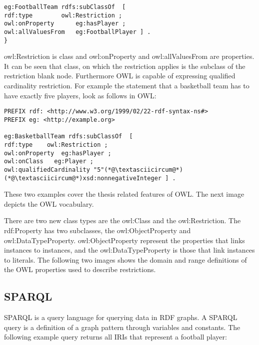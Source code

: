 \begin{lstlisting}[basicstyle=\footnotesize, captionpos=b, caption=OWL restriction in N3 format, label=lst:sparql,
frame=single]
eg:FootballTeam rdfs:subClassOf  [ 
rdf:type		owl:Restriction ; 
owl:onProperty		eg:hasPlayer ; 
owl:allValuesFrom	eg:FootballPlayer ] . 
}
\end{lstlisting}

owl:Restriction is class and owl:onProperty and owl:allValuesFrom are properties. It can be seen that class, on which the restriction applies is the subclass of the restriction blank node.
Furthermore OWL is capable of expressing qualified cardinality restriction. For example the statement that a basketball team has to have exactly five players, look as follows in OWL:


\begin{lstlisting}[captionpos=b, caption=OWL restriction in N3 format, label=lst:sparql,
basicstyle=\footnotesize,frame=single]
PREFIX rdf: <http://www.w3.org/1999/02/22-rdf-syntax-ns#>
PREFIX eg: <http://example.org> 

eg:BasketballTeam rdfs:subClassOf  [
rdf:type	owl:Restriction ; 
owl:onProperty	eg:hasPlayer ; 
owl:onClass	  eg:Player ; 
owl:qualifiedCardinality "5"(*@\textasciicircum@*)(*@\textasciicircum@*)xsd:nonnegativeInteger ] . 

\end{lstlisting}


These two examples cover the thesis related features of OWL. The next image depicts the OWL vocabulary. 



There are two new class types are the owl:Class and the owl:Restriction. The rdf:Property has two subclasses, the owl:ObjectProperty and owl:DataTypeProperty. owl:ObjectProperty represent the properties that links instances to instances, and the owl:DataTypeProperty is those that link instances to literals. The following two images shows the domain and range definitions of the OWL properties used to describe restrictions.


\subsection{SPARQL}

SPARQL is a query language for querying data in RDF graphs. A SPARQL query is a definition of a graph pattern through variables and constants. The following example query returns all IRIs that represent a football player: 

